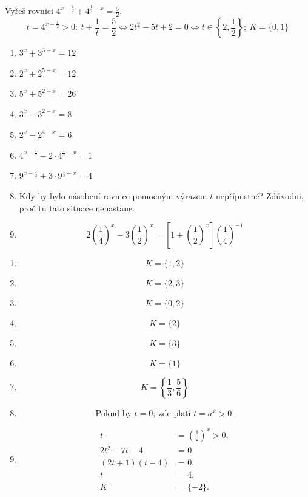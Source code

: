 \documentclass[11pt,a4paper]{article}
\begin{document}
\begin{zadaniReseniBox}[title={Rozšíření 1}]
Vyřeš rovnici $4^{x-\frac{1}{2}}+4^{\frac{1}{2}-x}=\frac{5}{2}$.
\tcblower
\[
t=4^{x-\frac{1}{2}}>0:\ t+\frac{1}{t}=\frac{5}{2}\iff 2t^2-5t+2=0\iff t\in\left\{2,\frac{1}{2}\right\};\ K=\{0,1\}
\]
\end{zadaniReseniBox}
\begin{zadaniReseniBox}[title={Domácí úkol}]
\begin{enumerate}[label=\alph*)]
\item $3^x+3^{3-x}=12$
\item $2^x+2^{5-x}=12$
\item $5^x+5^{2-x}=26$
\item $3^x-3^{2-x}=8$
\item $2^x-2^{4-x}=6$
\item $4^{x-\frac{1}{2}}-2\cdot4^{\frac{1}{2}-x}=1$
\item $9^{x-\frac{1}{3}}+3\cdot9^{\frac{1}{3}-x}=4$
\item Kdy by bylo násobení rovnice pomocným výrazem $t$ nepřípustné? Zdůvodni, proč tu tato situace nenastane.
\item \[ 2\left(\frac{1}{4}\right)^x-3\left(\frac{1}{2}\right)^x=\left[1+\left(\frac{1}{2}\right)^x\right]\left(\frac{1}{4}\right)^{-1} \]
\end{enumerate}
\tcblower
\setlength{\abovedisplayskip}{2pt}\setlength{\belowdisplayskip}{2pt}
\setlength{\abovedisplayshortskip}{2pt}\setlength{\belowdisplayshortskip}{2pt}
\begin{enumerate}[label=\alph*)]
\item \[K=\{1,2\}\]
\item \[K=\{2,3\}\]
\item \[K=\{0,2\}\]
\item \[K=\{2\}\]
\item \[K=\{3\}\]
\item \[K=\{1\}\]
\item \[K=\left\{\frac{1}{3},\frac{5}{6}\right\}\]
\item \[\text{Pokud by }t=0;\ \text{zde platí }t=a^x>0.\]
\item \[\begin{aligned}t&=\left(\frac{1}{2}\right)^x>0,\\2t^2-7t-4&=0,\\(2t+1)(t-4)&=0,\\t&=4,\\K&=\{-2\}.\end{aligned}\]
\end{enumerate}
\end{zadaniReseniBox}
\end{document}
